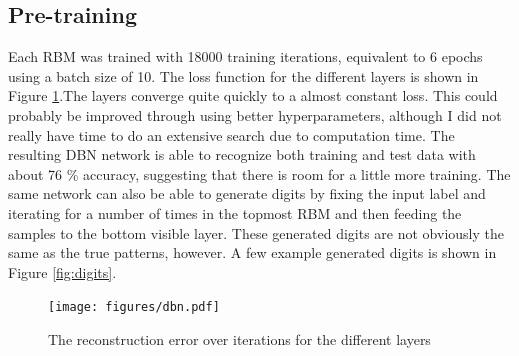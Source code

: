 \documentclass[a4paper]{article}
\begin{document}
\subsection{Pre-training}
Each RBM was trained with 18000 training iterations, equivalent to 6 epochs using a batch size of 10. The loss function for the different layers is shown in Figure \ref{fig:layers}.The layers converge quite quickly to a almost constant loss. This could probably be improved through using better hyperparameters, although I did not really have time to do an extensive search due to computation time. The resulting DBN network is able to recognize both training and test data with about 76 \% accuracy, suggesting that there is room for a little more training. The same network can also be able to generate digits by fixing the input label and iterating for a number of times in the topmost RBM and then feeding the samples to the bottom visible layer. These generated digits are not obviously the same as the true patterns, however. A few example generated digits is shown in Figure \ref{fig:digits}.
\begin{figure}[ht]
   \centering
   \texttt{[image: figures/dbn.pdf]}
   \caption{The reconstruction error over iterations for the different layers}
   \label{fig:layers}
\end{figure}
\end{document}
